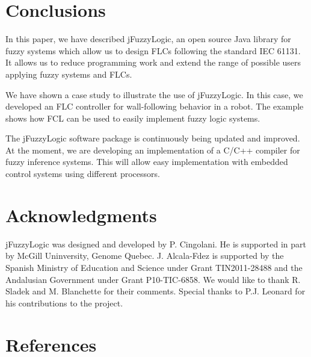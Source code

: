 \documentclass[11pt,twoside]{article}
\begin{document}
\begin{multicols}{2}
\section{Conclusions}
\label{sec:con}

In this paper, we have described jFuzzyLogic, an open source Java library for fuzzy systems which allow us to design FLCs following the standard IEC 61131.
It allows us to reduce programming work and extend the range of possible users applying fuzzy systems and FLCs.

We have shown a case study to illustrate the use of jFuzzyLogic. 
In this case, we developed an FLC controller for wall-following behavior in a robot.
The example shows how FCL can be used to easily implement fuzzy logic systems.

The jFuzzyLogic software package is continuously being updated and improved. 
At the moment, we are developing an implementation of a C/C++ compiler for fuzzy inference systems. 
This will allow easy implementation with embedded control systems using different processors.

\section*{Acknowledgments}
jFuzzyLogic was designed and developed by P. Cingolani. He is supported in part by McGill Uninversity, Genome Quebec. J. Alcala-Fdez is supported by the Spanish Ministry of Education and Science under Grant TIN2011-28488 and the Andalusian Government under Grant P10-TIC-6858. We would like to thank R. Sladek and M. Blanchette for their comments. Special thanks to P.J. Leonard for his contributions to the project.


\section*{References}


\end{multicols}
\end{document}
